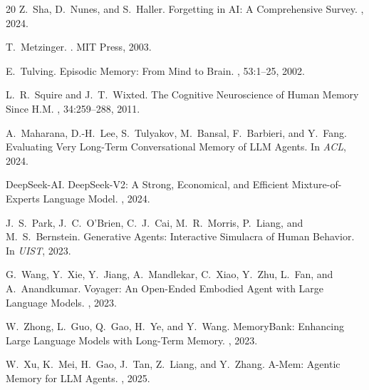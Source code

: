 \documentclass[11pt,twocolumn]{article}
\begin{document}
\begin{thebibliography}{20}
Z.~Sha, D.~Nunes, and S.~Haller.
\newblock Forgetting in AI: A Comprehensive Survey.
, 2024.

T.~Metzinger.
.
\newblock MIT Press, 2003.

E.~Tulving.
\newblock Episodic Memory: From Mind to Brain.
, 53:1--25, 2002.

L.~R.~Squire and J.~T.~Wixted.
\newblock The Cognitive Neuroscience of Human Memory Since H.M.
, 34:259--288, 2011.

A.~Maharana, D.-H.~Lee, S.~Tulyakov, M.~Bansal, F.~Barbieri, and Y.~Fang.
\newblock Evaluating Very Long-Term Conversational Memory of LLM Agents.
\newblock In {\em ACL}, 2024.

DeepSeek-AI.
\newblock DeepSeek-V2: A Strong, Economical, and Efficient Mixture-of-Experts Language Model.
, 2024.

J.~S.~Park, J.~C.~O'Brien, C.~J.~Cai, M.~R.~Morris, P.~Liang, and M.~S.~Bernstein.
\newblock Generative Agents: Interactive Simulacra of Human Behavior.
\newblock In {\em UIST}, 2023.

G.~Wang, Y.~Xie, Y.~Jiang, A.~Mandlekar, C.~Xiao, Y.~Zhu, L.~Fan, and A.~Anandkumar.
\newblock Voyager: An Open-Ended Embodied Agent with Large Language Models.
, 2023.

W.~Zhong, L.~Guo, Q.~Gao, H.~Ye, and Y.~Wang.
\newblock MemoryBank: Enhancing Large Language Models with Long-Term Memory.
, 2023.

W.~Xu, K.~Mei, H.~Gao, J.~Tan, Z.~Liang, and Y.~Zhang.
\newblock A-Mem: Agentic Memory for LLM Agents.
, 2025.

\end{thebibliography}
\end{document}
